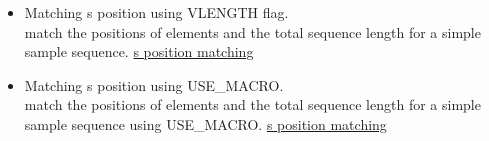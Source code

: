 \begin{itemize}
	\item Matching s position using VLENGTH flag.\\
	match the positions of elements and the total sequence length
        for a simple sample sequence.  
        \href{http://cern.ch/madx/madX/examples/match/s-match/job.s-match.madx}{s position matching}
	
	\item Matching s position using USE\_MACRO.\\
	match the positions of elements and the total sequence length for a simple sample sequence using USE\_MACRO. 
        \href{http://cern.ch/madx/madX/examples/match/s-match-usemacro/job.s-match-usemacro.madx}{s position matching}

\end{itemize}


